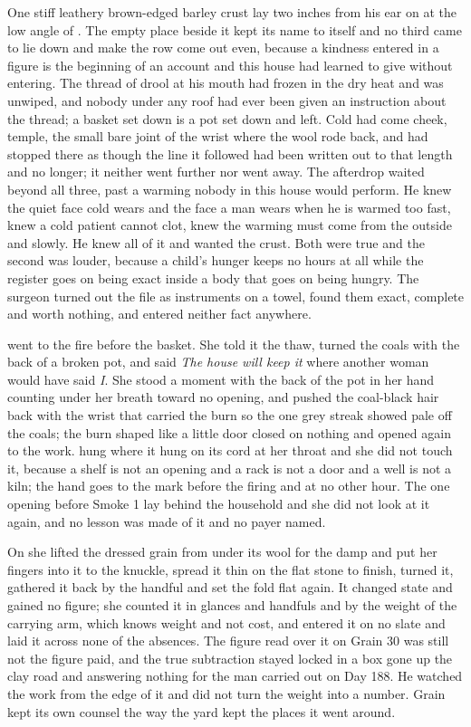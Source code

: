 One stiff leathery brown-edged barley crust lay two inches from his ear on  at the low angle of . The empty place beside it kept its name to itself and no third came to lie down and make the row come out even, because a kindness entered in a figure is the beginning of an account and this house had learned to give without entering. The thread of drool at his mouth had frozen in the dry heat and was unwiped, and nobody under any roof had ever been given an instruction about the thread; a basket set down is a pot set down and left. Cold had come cheek, temple, the small bare joint of the wrist where the wool rode back, and had stopped there as though the line it followed had been written out to that length and no longer; it neither went further nor went away. The afterdrop waited beyond all three, past a warming nobody in this house would perform. He knew the quiet face cold wears and the face a man wears when he is warmed too fast, knew a cold patient cannot clot, knew the warming must come from the outside and slowly. He knew all of it and wanted the crust. Both were true and the second was louder, because a child's hunger keeps no hours at all while the register goes on being exact inside a body that goes on being hungry. The surgeon turned out the file as instruments on a towel, found them exact, complete and worth nothing, and entered neither fact anywhere.

 went to the fire before the basket. She told it the thaw, turned the coals with the back of a broken pot, and said \emph{The house will keep it} where another woman would have said \emph{I}. She stood a moment with the back of the pot in her hand counting under her breath toward no opening, and pushed the coal-black hair back with the wrist that carried the burn so the one grey streak showed pale off the coals; the burn shaped like a little door closed on nothing and opened again to the work.  hung where it hung on its cord at her throat and she did not touch it, because a shelf is not an opening and a rack is not a door and a well is not a kiln; the hand goes to the mark before the firing and at no other hour. The one opening before Smoke 1 lay behind the household and she did not look at it again, and no lesson was made of it and no payer named.

On  she lifted the dressed grain from under its wool for the damp and put her fingers into it to the knuckle, spread it thin on the flat stone to finish, turned it, gathered it back by the handful and set the fold flat again. It changed state and gained no figure; she counted it in glances and handfuls and by the weight of the carrying arm, which knows weight and not cost, and entered it on no slate and laid it across none of the absences. The figure read over it on Grain 30 was still not the figure paid, and the true subtraction stayed locked in a box gone up the clay road and answering nothing for the man carried out on Day 188. He watched the work from the edge of it and did not turn the weight into a number. Grain kept its own counsel the way the yard kept the places it went around.

